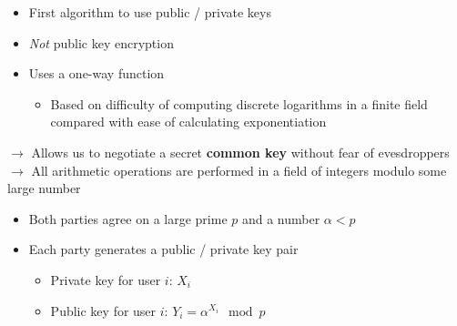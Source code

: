 \documentclass{easyclass}
\begin{document}
\begin{theo}{}
    \begin{itemize}
        \item First algorithm to use public / private keys
        \item \emph{Not} public key encryption
        \item Uses a one-way function 
        \begin{itemize}
            \item Based on difficulty of computing discrete 
            logarithms in a finite field compared with ease of calculating exponentiation
        \end{itemize}
    \end{itemize}
    $\rightarrow$ Allows us to negotiate a secret \textbf{common key} without fear of evesdroppers\\
    $\rightarrow$ All arithmetic operations are performed in a field of integers modulo some large number
    \begin{itemize}
        \item Both parties agree on a large prime $p$ and a number $\alpha < p$
        \item Each party generates a public / private key pair
        \begin{itemize}
            \item Private key for user $i$: $X_i$
            \item Public key for user $i$: $Y_i = \alpha^{X_i} \mod p$
        \end{itemize}
    \end{itemize}
\end{theo}
\end{document}
